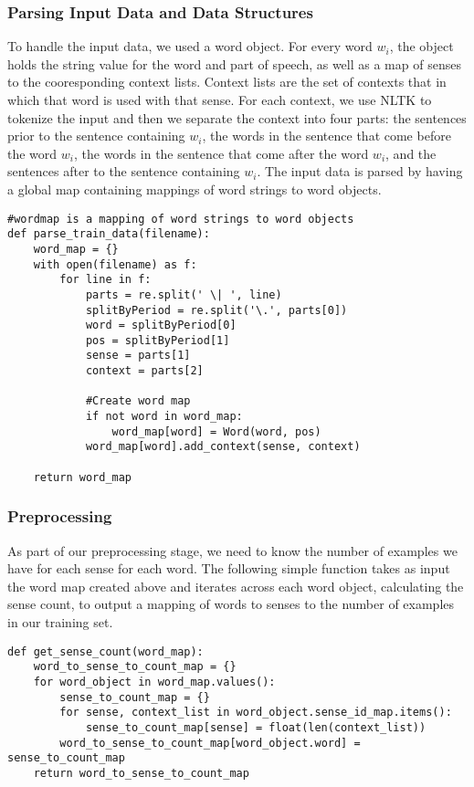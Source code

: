 \documentclass[11pt]{article}
\begin{document}
\subsubsection{Parsing Input Data and Data Structures}

To handle the input data, we used a word object. For every word $w_i$, the object holds the string value for the word and part of speech, as well as a map of senses to the cooresponding context lists. Context lists are the set of contexts that in which that word is used with that sense. For each context, we use NLTK to tokenize the input and then we separate the context into four parts: the sentences prior to the sentence containing $w_i$, the words in the sentence that come before the word $w_i$, the words in the sentence that come after the word $w_i$, and the sentences after to the sentence containing $w_i$. The input data is parsed by having a global map containing mappings of word strings to word objects. 

\begin{lstlisting}
#wordmap is a mapping of word strings to word objects
def parse_train_data(filename):
    word_map = {}
    with open(filename) as f:
        for line in f:
            parts = re.split(' \| ', line)
            splitByPeriod = re.split('\.', parts[0])
            word = splitByPeriod[0]
            pos = splitByPeriod[1]
            sense = parts[1]
            context = parts[2]

            #Create word map
            if not word in word_map:
                word_map[word] = Word(word, pos)
            word_map[word].add_context(sense, context)

    return word_map
\end{lstlisting}

\subsubsection{Preprocessing}
As part of our preprocessing stage, we need to know the number of examples we have for each sense for each word. The following simple function takes as input the word map created above and iterates across each word object, calculating the sense count, to output a mapping of words to senses to the number of examples in our training set.

\begin{lstlisting}
def get_sense_count(word_map):
    word_to_sense_to_count_map = {}
    for word_object in word_map.values():
        sense_to_count_map = {}
        for sense, context_list in word_object.sense_id_map.items():
            sense_to_count_map[sense] = float(len(context_list))
        word_to_sense_to_count_map[word_object.word] = sense_to_count_map
    return word_to_sense_to_count_map
\end{lstlisting}
\end{document}
